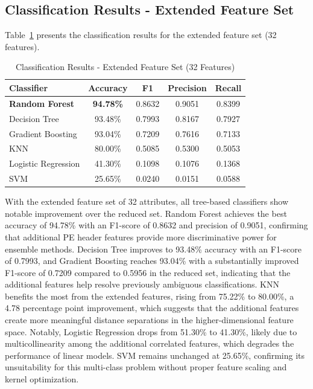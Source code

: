 \documentclass[conference,a4paper]{IEEEtran}
\begin{document}
\subsection{Classification Results - Extended Feature Set}

Table~\ref{tab:extended} presents the classification results for the extended feature set (32 features).

\begin{table}[!htbp]
\centering
\caption{Classification Results - Extended Feature Set (32 Features)}
\label{tab:extended}
\begin{tabular}{lcccc}
\toprule
\textbf{Classifier} & \textbf{Accuracy} & \textbf{F1} & \textbf{Precision} & \textbf{Recall} \\
\midrule
\textbf{Random Forest} & \textbf{94.78\%} & 0.8632 & 0.9051 & 0.8399 \\
Decision Tree & 93.48\% & 0.7993 & 0.8167 & 0.7927 \\
Gradient Boosting & 93.04\% & 0.7209 & 0.7616 & 0.7133 \\
KNN & 80.00\% & 0.5085 & 0.5300 & 0.5053 \\
Logistic Regression & 41.30\% & 0.1098 & 0.1076 & 0.1368 \\
SVM & 25.65\% & 0.0240 & 0.0151 & 0.0588 \\
\bottomrule
\end{tabular}
\end{table}

With the extended feature set of 32 attributes, all tree-based classifiers show notable improvement over the reduced set. Random Forest achieves the best accuracy of 94.78\% with an F1-score of 0.8632 and precision of 0.9051, confirming that additional PE header features provide more discriminative power for ensemble methods. Decision Tree improves to 93.48\% accuracy with an F1-score of 0.7993, and Gradient Boosting reaches 93.04\% with a substantially improved F1-score of 0.7209 compared to 0.5956 in the reduced set, indicating that the additional features help resolve previously ambiguous classifications. KNN benefits the most from the extended features, rising from 75.22\% to 80.00\%, a 4.78 percentage point improvement, which suggests that the additional features create more meaningful distance separations in the higher-dimensional feature space. Notably, Logistic Regression drops from 51.30\% to 41.30\%, likely due to multicollinearity among the additional correlated features, which degrades the performance of linear models. SVM remains unchanged at 25.65\%, confirming its unsuitability for this multi-class problem without proper feature scaling and kernel optimization.
\end{document}

